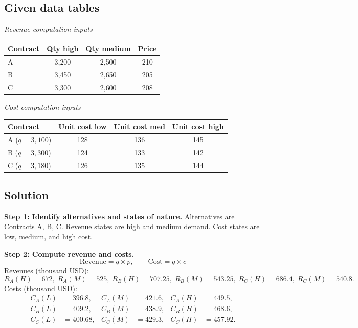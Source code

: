 \begin{ExamProblems}
		\subsection*{Given data tables}
		\begin{center}
			\begin{minipage}[t]{0.48\linewidth}
				\textit{Revenue computation inputs}
				\begin{center}
					\begin{tabular}{l c c c}
						\toprule
						Contract & Qty high & Qty medium & Price \\
						\midrule
						A & 3{,}200 & 2{,}500 & 210 \\
						B & 3{,}450 & 2{,}650 & 205 \\
						C & 3{,}300 & 2{,}600 & 208 \\
						\bottomrule
					\end{tabular}
				\end{center}
			\end{minipage}
			\hfill
			\begin{minipage}[t]{0.48\linewidth}
				\textit{Cost computation inputs}
				\begin{center}
					\begin{tabular}{l c c c}
						\toprule
						Contract & Unit cost low & Unit cost med & Unit cost high \\
						\midrule
						A ($q=3{,}100$) & 128 & 136 & 145 \\
						B ($q=3{,}300$) & 124 & 133 & 142 \\
						C ($q=3{,}180$) & 126 & 135 & 144 \\
						\bottomrule
					\end{tabular}
				\end{center}
			\end{minipage}
		\end{center}
		
		\subsection*{Solution}
		\textbf{Step 1: Identify alternatives and states of nature.} Alternatives are Contracts A, B, C. Revenue states are high and medium demand. Cost states are low, medium, and high cost.
		
		\textbf{Step 2: Compute revenue and costs.}
		\[
		\text{Revenue}=q\times p, \qquad \text{Cost}=q\times c
		\]
		Revenues (thousand USD):
		\[
		R_A(H)=672,\; R_A(M)=525,\; R_B(H)=707.25,\; R_B(M)=543.25,\; R_C(H)=686.4,\; R_C(M)=540.8.
		\]
		Costs (thousand USD):
		\[
		\begin{aligned}
		C_A(L)&=396.8, & C_A(M)&=421.6, & C_A(H)&=449.5,\\
		C_B(L)&=409.2, & C_B(M)&=438.9, & C_B(H)&=468.6,\\
		C_C(L)&=400.68, & C_C(M)&=429.3, & C_C(H)&=457.92.
		\end{aligned}
		\]
		

\end{ExamProblems}
